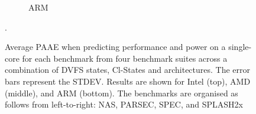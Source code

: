 \begin{figure}[H]
\begin{subfigure}[t]{\textwidth}
    \centering
    \caption{ARM}
    \label{fig: arm-singlecore}
\end{subfigure}
    \caption[Average PAAE when predicting performance and power per benchmark on a single-core]{ Average PAAE when predicting performance and power on a single-core for each benchmark from four benchmark  suites across a combination of DVFS states, Cl-States and architectures. The error bars represent the STDEV. Results are shown for Intel (top), AMD (middle), and ARM (bottom). The benchmarks are organised as follows from left-to-right: NAS, PARSEC, SPEC, and SPLASH2x}.
    \label{fig: singlecoredetail} 

\end{figure} 


